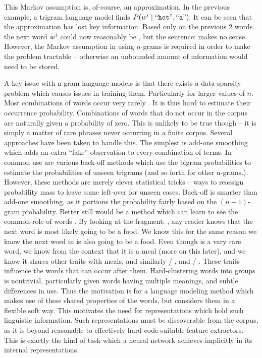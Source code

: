\documentclass[parskip]{komatufte}
\begin{document}
This Markov assumption is, of-course, an approximation.
In the previous example, a trigram language model finds $P(\n w_i \mid \natlang{hot}, \natlang{a})$.
It can be seen that the approximation has lost key information.
Based only on the previous 2 words the next word $\n w_i$ could now reasonably be , but the sentence:  makes no sense.
However, the Markov assumption in using $n$-grams is required in order to make the problem tractable -- otherwise an unbounded amount of information would need to be stored. 

A key issue with n-gram language models is that there exists a data-sparsity problem which causes issues in training them.
Particularly for larger values of $n$.
Most combinations of words occur very rarely .
It is thus hard to estimate their occurrence probability.
Combinations of words that do not occur in the corpus are naturally given a probability of zero.
This is unlikely to be true though -- it is simply a matter of rare phrases never occurring in a finite corpus.
Several approaches have been taken to handle this.
The simplest is add-one smoothing which adds an extra ``fake'' observation to every combination of terms.
In common use are various back-off methods  which use the bigram probabilities to estimate the probabilities of unseen trigrams (and so forth for other n-grams.).
%
%
However, these methods are merely clever statistical tricks -- ways to reassign probability mass  to leave some left-over for unseen cases.
Back-off is smarter than add-one smoothing, as it portions the probability fairly based on the $(n{-}1)$-gram probability.
Better still would be a method which can learn to see the common-role of words .
By looking at the fragment: , any reader knows that the next word is most likely going to be a food.
We know this for the same reason we know the next word in  is also going to be a food.
Even though  is a vary rare word, we know from the context that it is a meal (more on this later), and we know it shares other traits with meals, and similarly  / , and  / .
These traits influence the words that can occur after them.
Hard-clustering words into groups is nontrivial, particularly given words having multiple meanings, and subtle differences in use.
Thus the motivation is for a language modeling method which makes use of these shared properties of the words, but considers them in a flexible soft way.
This motivates the need for representations which hold such linguistic information.
Such representations must be discoverable from the corpus, as it is beyond reasonable to effectively hard-code suitable feature extractors.
This is exactly the kind of task which a neural network achieves implicitly in its internal representations.
\end{document}
